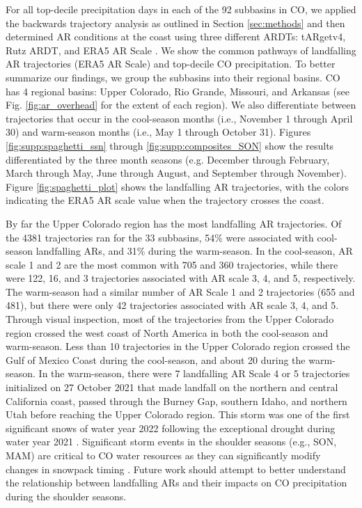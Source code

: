 \documentclass[draft]{agujournal2019}
\begin{document}
For all top-decile precipitation days in each of the 92 subbasins in CO, we applied the backwards trajectory analysis as outlined in Section \ref{sec:methods} and then determined AR conditions at the coast using three different ARDTs: tARgetv4, Rutz ARDT, and ERA5 AR Scale \cite{MartinRalph2019, Rutz2014, Guan2024AERA5}. We show the common pathways of landfalling AR trajectories (ERA5 AR Scale) and top-decile CO precipitation. To better summarize our findings, we group the subbasins into their regional basins. CO has 4 regional basins: Upper Colorado, Rio Grande, Missouri, and Arkansas (see Fig. \ref{fig:ar_overhead} for the extent of each region). We also differentiate between trajectories that occur in the cool-season months (i.e., November 1 through April 30) and warm-season months (i.e., May 1 through October 31). Figures \ref{fig:supp:spaghetti_ssn} through \ref{fig:supp:composites_SON} show the results differentiated by the three month seasons (e.g. December through February, March through May, June through August, and September through November). Figure \ref{fig:spaghetti_plot} shows the landfalling AR trajectories, with the colors indicating the ERA5 AR scale value when the trajectory crosses the coast. 

By far the Upper Colorado region has the most landfalling AR trajectories. Of the 4381 trajectories ran for the 33 subbasins, 54\% were associated with cool-season landfalling ARs, and 31\% during the warm-season. In the cool-season, AR scale 1 and 2 are the most common with 705 and 360 trajectories, while there were 122, 16, and 3 trajectories associated with AR scale 3, 4, and 5, respectively. The warm-season had a similar number of AR Scale 1 and 2 trajectories (655 and 481), but there were only 42 trajectories associated with AR scale 3, 4, and 5. Through visual inspection, most of the trajectories from the Upper Colorado region crossed the west coast of North America in both the cool-season and warm-season. Less than 10 trajectories in the Upper Colorado region crossed the Gulf of Mexico Coast during the cool-season, and about 20 during the warm-season. In the warm-season, there were 7 landfalling AR Scale 4 or 5 trajectories initialized on 27 October 2021 that made landfall on the northern and central California coast, passed through the Burney Gap, southern Idaho, and northern Utah before reaching the Upper Colorado region. This storm was one of the first significant snows of water year 2022 following the exceptional drought during water year 2021 \cite{Bolinger2023ClimateEdition}. Significant storm events in the shoulder seasons (e.g., SON, MAM) are critical to CO water resources as they can significantly modify changes in snowpack timing \cite{Heldmyer2023ABasin}. Future work should attempt to better understand the relationship between landfalling ARs and their impacts on CO precipitation during the shoulder seasons.
\end{document}
